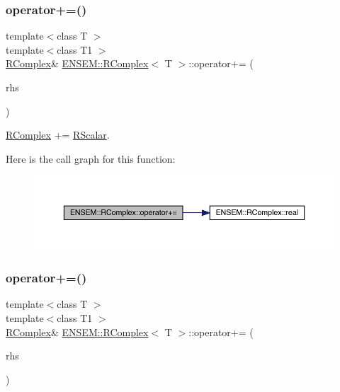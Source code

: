 \subsubsection{\texorpdfstring{operator+=()}{operator+=()}\hspace{0.1cm}{\footnotesize\ttfamily [2/4]}}
{\footnotesize\ttfamily template$<$class T $>$ \\
template$<$class T1 $>$ \\
\mbox{\hyperlink{classENSEM_1_1RComplex}{R\+Complex}}\& \mbox{\hyperlink{classENSEM_1_1RComplex}{E\+N\+S\+E\+M\+::\+R\+Complex}}$<$ T $>$\+::operator+= (\begin{DoxyParamCaption}\item[{const \mbox{\hyperlink{classENSEM_1_1RScalar}{R\+Scalar}}$<$ T1 $>$ \&}]{rhs }\end{DoxyParamCaption})\hspace{0.3cm}{\ttfamily [inline]}}



\mbox{\hyperlink{classENSEM_1_1RComplex}{R\+Complex}} += \mbox{\hyperlink{classENSEM_1_1RScalar}{R\+Scalar}}. 

Here is the call graph for this function\+:
\nopagebreak
\begin{figure}[H]
\begin{center}
\leavevmode
\includegraphics[width=350pt]{d9/d0e/classENSEM_1_1RComplex_a0a7beaab81b8f5e2129a4c7b1074f85c_cgraph}
\end{center}
\end{figure}
\mbox{\label{classENSEM_1_1RComplex_aca53957ad00d064844898e907e6f6fab}} 
\subsubsection{\texorpdfstring{operator+=()}{operator+=()}\hspace{0.1cm}{\footnotesize\ttfamily [3/4]}}
{\footnotesize\ttfamily template$<$class T $>$ \\
template$<$class T1 $>$ \\
\mbox{\hyperlink{classENSEM_1_1RComplex}{R\+Complex}}\& \mbox{\hyperlink{classENSEM_1_1RComplex}{E\+N\+S\+E\+M\+::\+R\+Complex}}$<$ T $>$\+::operator+= (\begin{DoxyParamCaption}\item[{const \mbox{\hyperlink{classENSEM_1_1RComplex}{R\+Complex}}$<$ T1 $>$ \&}]{rhs }\end{DoxyParamCaption})\hspace{0.3cm}{\ttfamily [inline]}}



